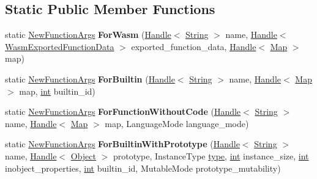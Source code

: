 \subsection*{Static Public Member Functions}
\begin{DoxyCompactItemize}
\item 
\mbox{\label{classv8_1_1internal_1_1NewFunctionArgs_a1e1c67db3f1dae225e0b7227262fd2e6}} 
static \mbox{\hyperlink{classv8_1_1internal_1_1NewFunctionArgs}{New\+Function\+Args}} {\bfseries For\+Wasm} (\mbox{\hyperlink{classv8_1_1internal_1_1Handle}{Handle}}$<$ \mbox{\hyperlink{classv8_1_1internal_1_1String}{String}} $>$ name, \mbox{\hyperlink{classv8_1_1internal_1_1Handle}{Handle}}$<$ \mbox{\hyperlink{classv8_1_1internal_1_1WasmExportedFunctionData}{Wasm\+Exported\+Function\+Data}} $>$ exported\+\_\+function\+\_\+data, \mbox{\hyperlink{classv8_1_1internal_1_1Handle}{Handle}}$<$ \mbox{\hyperlink{classv8_1_1internal_1_1Map}{Map}} $>$ map)
\item 
\mbox{\label{classv8_1_1internal_1_1NewFunctionArgs_af2b09b57436c7d59343ede323ad359b4}} 
static \mbox{\hyperlink{classv8_1_1internal_1_1NewFunctionArgs}{New\+Function\+Args}} {\bfseries For\+Builtin} (\mbox{\hyperlink{classv8_1_1internal_1_1Handle}{Handle}}$<$ \mbox{\hyperlink{classv8_1_1internal_1_1String}{String}} $>$ name, \mbox{\hyperlink{classv8_1_1internal_1_1Handle}{Handle}}$<$ \mbox{\hyperlink{classv8_1_1internal_1_1Map}{Map}} $>$ map, \mbox{\hyperlink{classint}{int}} builtin\+\_\+id)
\item 
\mbox{\label{classv8_1_1internal_1_1NewFunctionArgs_a88340805d7f0430777db2b54b6287993}} 
static \mbox{\hyperlink{classv8_1_1internal_1_1NewFunctionArgs}{New\+Function\+Args}} {\bfseries For\+Function\+Without\+Code} (\mbox{\hyperlink{classv8_1_1internal_1_1Handle}{Handle}}$<$ \mbox{\hyperlink{classv8_1_1internal_1_1String}{String}} $>$ name, \mbox{\hyperlink{classv8_1_1internal_1_1Handle}{Handle}}$<$ \mbox{\hyperlink{classv8_1_1internal_1_1Map}{Map}} $>$ map, Language\+Mode language\+\_\+mode)
\item 
\mbox{\label{classv8_1_1internal_1_1NewFunctionArgs_a8b5ae4f5a7a752d94b16506d98b58ea8}} 
static \mbox{\hyperlink{classv8_1_1internal_1_1NewFunctionArgs}{New\+Function\+Args}} {\bfseries For\+Builtin\+With\+Prototype} (\mbox{\hyperlink{classv8_1_1internal_1_1Handle}{Handle}}$<$ \mbox{\hyperlink{classv8_1_1internal_1_1String}{String}} $>$ name, \mbox{\hyperlink{classv8_1_1internal_1_1Handle}{Handle}}$<$ \mbox{\hyperlink{classv8_1_1internal_1_1Object}{Object}} $>$ prototype, Instance\+Type \mbox{\hyperlink{classstd_1_1conditional_1_1type}{type}}, \mbox{\hyperlink{classint}{int}} instance\+\_\+size, \mbox{\hyperlink{classint}{int}} inobject\+\_\+properties, \mbox{\hyperlink{classint}{int}} builtin\+\_\+id, Mutable\+Mode prototype\+\_\+mutability)

\end{DoxyCompactItemize}
